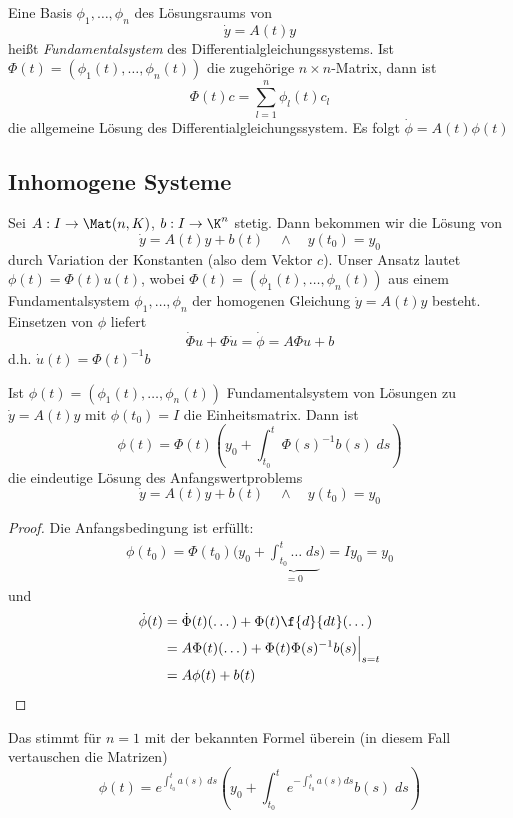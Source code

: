 \documentclass[a4paper,10pt]{scrbook}
\begin{document}
Eine Basis $\phi_1,\dotsc, \phi_n$ des Lösungsraums von
\[
	\dot y = A(t) y
\]
heißt \emph{Fundamentalsystem} des Differentialgleichungssystems.
Ist $\Phi(t) = (\phi_1(t), \dotsc, \phi_n(t))$ die zugehörige $n\times n$-Matrix, dann ist
\[
	\Phi(t) c = \sum_{l=1}^n \phi_l(t) c_l
\]
die allgemeine Lösung des Differentialgleichungssystem.
Es folgt $\dot \phi = A(t) \phi(t)$


\subsection{Inhomogene Systeme}

Sei $A : I \to \Mat(n,K)$, $b:I\to \K^n$ stetig.
Dann bekommen wir die Lösung von
\[
	\dot y = A(t)y + b(t) \quad \land \quad y(t_0) = y_0
\]
durch Variation der Konstanten (also dem Vektor $c$).
Unser Ansatz lautet	$\phi(t) = \Phi(t) u(t)$, wobei
$\Phi(t) = (\phi_1(t),\dotsc, \phi_n(t))$ aus einem Fundamentalsystem $\phi_1,\dotsc, \phi_n$ der homogenen Gleichung $\dot y = A(t)y$ besteht.
Einsetzen von $\phi$ liefert
\[
	\dot \Phi u + \Phi \dot u = \dot \phi = A\Phi u + b
\]
d.h. $\dot u(t) = \Phi(t)^{-1}b$

\begin{st}
	Ist $\phi(t) = (\phi_1(t),\dotsc, \phi_n(t))$ Fundamentalsystem von Lösungen zu $\dot y = A(t)y$ mit $\phi(t_0) = I$ die Einheitsmatrix.
	Dann ist
	\[
		\phi(t) = \Phi(t)\left(y_0 + \int_{t_0}^t\Phi(s)^{-1}b(s) \; ds\right)
	\]
	die eindeutige Lösung des Anfangswertproblems
	\[
		\dot y = A(t)y + b(t) \quad \land \quad y(t_0) = y_0
	\]
	\begin{proof}
		\fixme[Ergänzen]
		Die Anfangsbedingung ist erfüllt:
		\begin{align*}
			\phi(t_0) = \Phi(t_0) \Big(y_0+\underbrace{\int_{t_0}^t \dotso \;ds}_{=0} \Big) = I y_0 = y_0
		\end{align*}
		und
		\begin{align*}
			\dot \phi(t) &= \dot \Phi(t) (\dotso) + \Phi(t) \f {d}{dt}(\dotso)\\
			&= A\Phi(t)(\dotso) + \Phi(t)\Phi(s)^{-1}b(s)\Big|_{s=t}\\
			&= A\phi(t) + b(t)
		\end{align*}
	\end{proof}
	\begin{note}
		Das stimmt für $n=1$ mit der bekannten Formel überein (in diesem Fall vertauschen die Matrizen)
		\[
			\phi(t) = e^{\int_{t_0}^t a(s) \;ds} \left(y_0 + \int_{t_0}^t e^{-\int_{t_0}^s a(s) ds} b(s) \;ds\right)
		\]
	\end{note}
\end{st}
\end{document}
